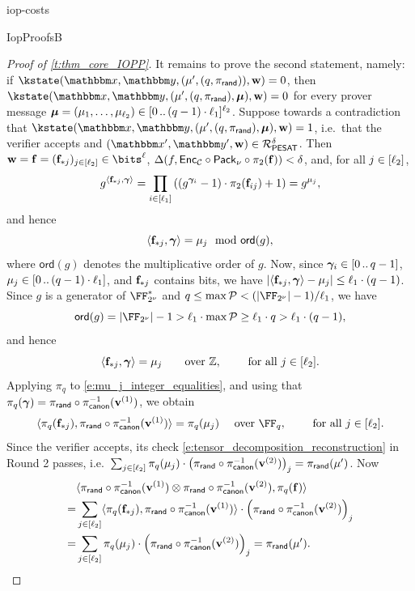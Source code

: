 \begin{lncsappendix}{iop-costs}
\begin{lncsmove}{IopProofsB}
\begin{proof}[Proof of \cref{t:thm_core_IOPP}]
It remains to prove the second statement, namely: if $\kstate(\inp,\lncsbreak\oracle,\lncsbreak(\mu', (q,\pirand)),\ww)=0$, then $\kstate(\inp,\lncsbreak\oracle,\lncsbreak(\mu', (q,\pirand), \bm{\mu}),\ww)=0$ for every prover message $\bm{\mu}=(\mu_1,\ldots, \mu_{\ell_2})\in [0 \, .. \, (q-1)\cdot \ell_1]^{\ell_2}$. Suppose towards a contradiction that $\kstate(\inp,\lncsbreak\oracle,\lncsbreak(\mu', (q,\pirand), \bm{\mu}),\ww)=1$, i.e.\ that the verifier accepts and $(\inp',\oracle',\ww)\in \PESAT^{\delta}$. Then $\ww=\bff=(\bff_{*j})_{j\in [\codedim_2]}\in \bits^\codedim$, $\Delta( f,\mathsf{Enc}_{\mathcal{C}}\circ \mathsf{Pack}_\nu\circ \pi_2(\mathbf{f})) < \delta$, and, for all $j\in [\ell_2]$, $$g^{\langle \mathbf{f}_{*j}, \bm{\gamma}\rangle} = \prod_{i \in [\ell_1]} \left(\left(g^{\bm{\gamma}_i}-1\right)\cdot \pi_2(\mathbf{f}_{ij}) +1\right)= g^{\mu_j},$$ and hence $$\langle \mathbf{f}_{*j}, \bm{\gamma}\rangle = \mu_j \mod \mathsf{ord}(g),$$ where $\mathsf{ord}(g)$ denotes the multiplicative order of $g$. Now, since $\bm{\gamma}_i\in [0 \, .. \, q-1]$, $\mu_j\in [0 \, .. \, (q-1)\cdot \ell_1]$, and $\mathbf{f}_{*j}$ contains bits, we have $|\langle \mathbf{f}_{*j}, \bm{\gamma}\rangle - \mu_j| \leq \ell_1 \cdot (q-1)$. Since $g$ is a generator of $\comfield^*$ and $q\leq \max\cP< \fieldboundsizeexponent$, we have $$\mathsf{ord}(g) = |\comfield|-1> \codedim_1\cdot \max\cP \geq \codedim_1\cdot q> \codedim_1 \cdot (q-1),$$ and hence
%
\begin{equation}\label{e:mu_j_integer_equalities}
\langle \mathbf{f}_{*j}, \bm{\gamma}\rangle = \mu_j \qquad \text{over } \mathbb{Z}, \qquad \text{ for all } j\in [\ell_2].
\end{equation}
%
Applying $\pi_q$ to \eqref{e:mu_j_integer_equalities}, and using that $\pi_q(\bm{\gamma})=\pi_{\mathsf{rand}}\circ \pi_{\mathsf{canon}}^{-1}(\mathbf{v}^{(1)})$, we obtain $$\langle \pi_q(\bff_{*j}), \pirand\circ \picanon^{-1}(\vv^{(1)})\rangle = \pi_q(\mu_j) \quad \text{ over } \FF_q, \qquad \text{ for all } j\in [\codedim_2].$$ Since the verifier accepts, its check \eqref{e:tensor_decomposition_reconstruction} in Round 2 passes, i.e.\ $\sum_{j\in [\ell_2]} \pi_q(\mu_j)\cdot \left(\pi_{\mathsf{rand}}\circ \pi_{\mathsf{canon}}^{-1}(\mathbf{v}^{(2)})\right)_j = \pi_{\mathsf{rand}}(\mu')$. Now
%
\begin{align*}
&\langle \pirand\circ \picanon^{-1}(\vv^{(1)}) \otimes \pirand\circ \picanon^{-1}(\vv^{(2)}), \pi_q(\bff)\rangle\\ =& \sum_{j\in [\codedim_2]} \langle \pi_q(\bff_{*j}), \pirand\circ \picanon^{-1}(\vv^{(1)})\rangle \cdot \left(\pirand\circ \picanon^{-1}(\vv^{(2)})\right)_j \\ =& \sum_{j\in [\codedim_2]} \pi_q(\mu_j)\cdot \left(\pirand\circ \picanon^{-1}(\vv^{(2)})\right)_j = \pirand(\mu').

\end{align*}
\end{proof}
\end{lncsmove}
\end{lncsappendix}
